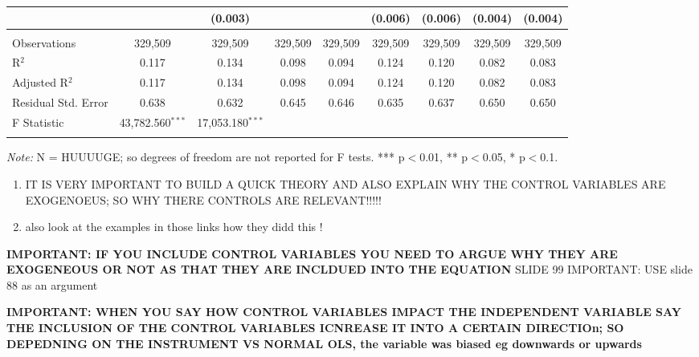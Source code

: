 \documentclass[a4paper]{article}
\begin{document}
\begin{table}[!htbp]
\begin{adjustwidth}{0.cm}{-0cm}
\begin{threeparttable}
\begin{tabular}{@{\extracolsep{-5pt}}lcccccccc}
  &  & (0.003) &  &  & (0.006) & (0.006) & (0.004) & (0.004) \\ 
 \hline \\[-1.8ex] 
Observations & 329,509 & 329,509 & 329,509 & 329,509 & 329,509 & 329,509 & 329,509 & 329,509 \\ 
R$^{2}$ & 0.117 & 0.134 & 0.098 & 0.094 & 0.124 & 0.120 & 0.082 & 0.083 \\ 
Adjusted R$^{2}$ & 0.117 & 0.134 & 0.098 & 0.094 & 0.124 & 0.120 & 0.082 & 0.083 \\ 
Residual Std. Error & 0.638  & 0.632 & 0.645  & 0.646  & 0.635  & 0.637  & 0.650  & 0.650  \\ 
F Statistic & 43,782.560$^{***}$ & 17,053.180$^{***}$  &  &  &  &  &  &  \\ 
\hline 
\hline \\[-3.5ex] 
\end{tabular} 
\begin{tablenotes}
      \small
      \item\textit{Note:} N = HUUUUGE; so degrees of freedom are not reported for F tests. *** p$<$0.01, ** p$<$0.05, * p$<$0.1.
    \end{tablenotes}
\end{threeparttable}
\end{adjustwidth}
%
\end{table}









\begin{enumerate}
   \item IT IS VERY IMPORTANT TO BUILD A QUICK THEORY AND ALSO EXPLAIN WHY THE CONTROL VARIABLES ARE EXOGENOEUS; SO WHY THERE CONTROLS ARE RELEVANT!!!!!
   \item also look at the examples in those links how they didd this !
\end{enumerate}








\textbf{IMPORTANT: IF YOU INCLUDE CONTROL VARIABLES YOU NEED TO ARGUE WHY THEY ARE EXOGENEOUS OR NOT AS THAT THEY ARE INCLDUED INTO THE EQUATION}
SLIDE 99
IMPORTANT: USE slide 88 as an argument

\textbf{IMPORTANT: WHEN YOU SAY HOW CONTROL VARIABLES IMPACT THE INDEPENDENT VARIABLE SAY THE INCLUSION OF THE CONTROL VARIABLES ICNREASE IT INTO A CERTAIN DIRECTIOn; SO DEPEDNING ON THE INSTRUMENT VS NORMAL OLS, the variable was biased eg downwards or upwards}
\end{document}
